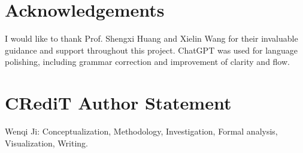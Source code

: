 \documentclass[journal]{IEEEtran}
\begin{document}
\section*{Acknowledgements}
I would like to thank Prof. Shengxi Huang and Xielin Wang for their invaluable guidance and support throughout this project. ChatGPT was used for language polishing, including grammar correction and improvement of clarity and flow.\\
\section*{CRediT Author Statement}
Wenqi Ji: Conceptualization, Methodology, Investigation, Formal analysis, Visualization, Writing.\\


\end{document}
